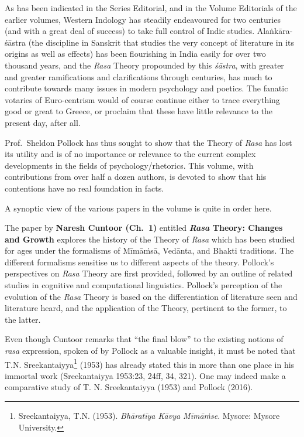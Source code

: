 \bigskip

As has been indicated in the Series Editorial, and in the Volume Editorials of the earlier volumes, Western Indology has steadily endeavoured for two centuries (and with a great deal of success) to take full control of Indic studies. Alaṅkāra-śāstra (the discipline in Sanskrit that studies the very concept of literature in its origins as well as effects) has been flourishing in India easily for over two thousand years, and the \textsl{Rasa} Theory propounded by this \textsl{śāstra}, with greater and greater ramifications and clarifications through centuries, has much to contribute towards many issues in modern psychology and poetics. The fanatic votaries of Euro-centrism would of course continue either to trace everything good or great to Greece, or proclaim that these have little relevance to the present day, after all.

Prof.\ Sheldon Pollock has thus sought to show that the Theory of \textsl{Rasa} has lost its utility and is of no importance or relevance to the current complex developments in the fields of psychology/rhetorics. This volume, with contributions from over half a dozen authors, is devoted to show that his contentions have no real foundation in facts.

A synoptic view of the various papers in the volume is quite in order here.

The paper by {\bf Naresh Cuntoor (Ch.~1)} entitled {\bf\textsl{Rasa} Theory: Changes and Growth} explores the history of the Theory of \textsl{Rasa} which has been studied for ages under the formalisms of Mīmāṁsā, Vedānta, and Bhakti traditions. The different formalisms sensitise us to different aspects of the theory. Pollock’s perspectives on \textsl{Rasa} Theory are first provided, followed by an outline of related studies in cognitive and computational linguistics. Pollock’s perception of the evolution of the \textsl{Rasa} Theory is based on the differentiation of literature seen and literature heard, and the application of the Theory, pertinent to the former, to the latter.

Even though Cuntoor remarks that “the final blow” to the existing notions of \textsl{rasa} expression, spoken of by Pollock as a valuable insight, it must be noted that T.N. Sreekantaiyya\footnote[1]{Sreekantaiyya, T.N. (1953). \textsl{Bhāratīya Kāvya Mīmāṁse}. Mysore: Mysore University.} (1953) has already stated this in more than one place in his immortal work (Sreekantaiyya 1953:23, 24ff, 34, 321). One may indeed make a comparative study of T. N. Sreekantaiyya (1953) and Pollock (2016).

